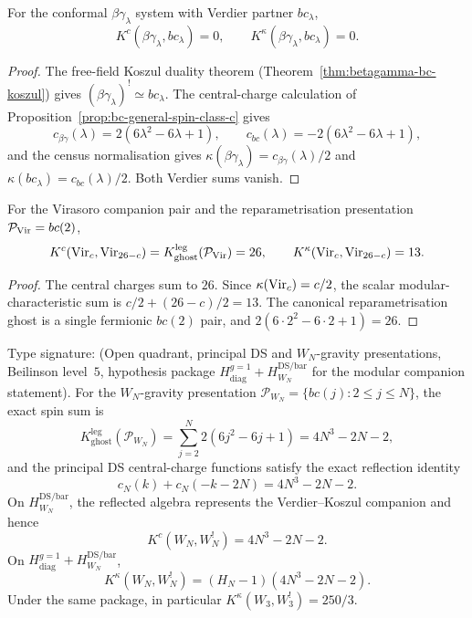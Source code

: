 \begin{corollary}
\label{cor:uc-K-betagamma}
\ClaimStatusProvedHere
For the conformal $\beta\gamma_\lambda$ system with Verdier partner
$bc_\lambda$,
\[
 K^c(\beta\gamma_\lambda,bc_\lambda)=0,\qquad
 K^\kappa(\beta\gamma_\lambda,bc_\lambda)=0.
\]
\end{corollary}

\begin{proof}
The free-field Koszul duality theorem
\textup{(}Theorem~\ref{thm:betagamma-bc-koszul}\textup{)} gives
$(\beta\gamma_\lambda)^!\simeq bc_\lambda$. The central-charge
calculation of Proposition~\ref{prop:bc-general-spin-class-c} gives
\[
 c_{\beta\gamma}(\lambda)=2(6\lambda^2-6\lambda+1),
 \qquad
 c_{bc}(\lambda)=-2(6\lambda^2-6\lambda+1),
\]
and the census normalisation gives
$\kappa(\beta\gamma_\lambda)=c_{\beta\gamma}(\lambda)/2$ and
$\kappa(bc_\lambda)=c_{bc}(\lambda)/2$. Both Verdier sums vanish.
\end{proof}

\begin{corollary}
\label{cor:uc-K-virasoro}
\ClaimStatusProvedHere
For the Virasoro companion pair and the reparametrisation presentation
$\mathcal P_{\mathrm{Vir}}=bc(2)$,
\[
 K^c(\mathrm{Vir}_c,\mathrm{Vir}_{26-c})
 =
 K_{\mathrm{ghost}}^{\mathrm{leg}}(\mathcal P_{\mathrm{Vir}})
 =26,\qquad
 K^\kappa(\mathrm{Vir}_c,\mathrm{Vir}_{26-c})=13.
\]
\end{corollary}

\begin{proof}
The central charges sum to $26$. Since
$\kappa(\mathrm{Vir}_c)=c/2$, the scalar modular-characteristic sum is
$c/2+(26-c)/2=13$. The canonical reparametrisation ghost is a single
fermionic $bc(2)$ pair, and
$2(6\cdot2^2-6\cdot2+1)=26$.
\end{proof}

\begin{corollary}
\label{cor:uc-K-WN}
Type signature: \textup{(}Open quadrant, principal DS and
$W_N$-gravity presentations, Beilinson level~$5$, hypothesis package
$H_{\mathrm{diag}}^{g=1}+H_{W_N}^{\mathrm{DS/bar}}$ for the modular
companion statement\textup{)}.
For the $W_N$-gravity presentation
$\mathcal P_{W_N}=\{bc(j):2\leq j\leq N\}$, the exact spin sum is
\[
 K_{\mathrm{ghost}}^{\mathrm{leg}}(\mathcal P_{W_N})
 =
 \sum_{j=2}^{N}2(6j^2-6j+1)
 =
 4N^3-2N-2,
\]
and the principal DS central-charge functions satisfy the exact
reflection identity
\[
 c_N(k)+c_N(-k-2N)=4N^3-2N-2.
\]
On $H_{W_N}^{\mathrm{DS/bar}}$, the reflected algebra represents the
Verdier--Koszul companion and hence
\[
 K^c(W_N,W_N^!)=4N^3-2N-2.
\]
On $H_{\mathrm{diag}}^{g=1}+H_{W_N}^{\mathrm{DS/bar}}$,
\[
 K^\kappa(W_N,W_N^!)
 =
 (H_N-1)(4N^3-2N-2).
\]
Under the same package, in particular
$K^\kappa(W_3,W_3^!)=250/3$.
\end{corollary}

